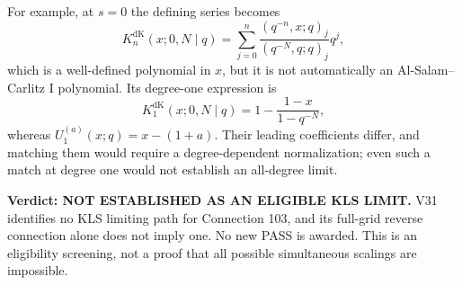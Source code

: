 \documentclass[11pt]{article}
\begin{document}
For example, at $s=0$ the defining series becomes
\[
K_n^{\mathrm{dK}}(x;0,N\mid q)
=\sum_{j=0}^{n}\frac{(q^{-n},x;q)_j}{(q^{-N},q;q)_j}q^j,
\]
which is a well-defined polynomial in $x$, but it is not automatically
an Al-Salam--Carlitz I polynomial. Its degree-one expression is
\[
K_1^{\mathrm{dK}}(x;0,N\mid q)
=1-\frac{1-x}{1-q^{-N}},
\]
whereas $U_1^{(a)}(x;q)=x-(1+a)$. Their leading coefficients differ,
and matching them would require a degree-dependent normalization; even
such a match at degree one would not establish an all-degree limit.

\noindent\textbf{Verdict: NOT ESTABLISHED AS AN ELIGIBLE KLS LIMIT.}
V31 identifies no KLS limiting path for Connection 103, and its full-grid
reverse connection alone does not imply one. No new PASS is awarded.
This is an eligibility screening, not a proof that all possible
simultaneous scalings are impossible.
\end{document}
